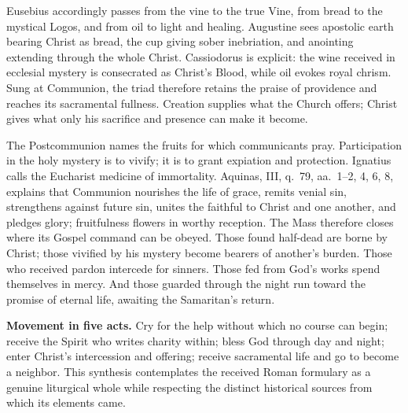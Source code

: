 Eusebius accordingly passes from the vine to the true Vine, from bread to the
mystical Logos, and from oil to light and healing. Augustine sees apostolic
earth bearing Christ as bread, the cup giving sober inebriation, and anointing
extending through the whole Christ. Cassiodorus is explicit: the wine received
in ecclesial mystery is consecrated as Christ's Blood, while oil evokes royal
chrism. Sung at Communion, the triad therefore retains the praise of providence
and reaches its sacramental fullness. Creation supplies what the Church offers;
Christ gives what only his sacrifice and presence can make it become.

The Postcommunion names the fruits for which communicants pray. Participation
in the holy mystery is to vivify; it is to grant expiation and protection.
Ignatius calls the Eucharist medicine of immortality. Aquinas,  III,
q.~79, aa.~1--2, 4, 6, 8, explains that Communion nourishes the life of grace,
remits venial sin, strengthens against future sin, unites the faithful to
Christ and one another, and pledges glory; fruitfulness flowers in worthy
reception. The Mass therefore closes where its Gospel command can be obeyed.
Those found half-dead are borne by Christ; those
vivified by his mystery become bearers of another's burden. Those who received
pardon intercede for sinners. Those fed from God's works spend themselves in
mercy. And those guarded through the night run toward the promise of eternal
life, awaiting the Samaritan's return.

\begin{studyframe}
\textbf{Movement in five acts.} Cry for the help without which no course can
begin; receive the Spirit who writes charity within; bless God through day and
night; enter Christ's intercession and offering; receive sacramental life and
go to become a neighbor. This synthesis contemplates the received Roman
formulary as a genuine liturgical whole while respecting the distinct
historical sources from which its elements came.
\end{studyframe}

\label{triptych:brief-synthesis:end}
\endgroup
\clearpage

